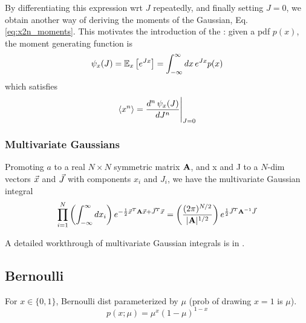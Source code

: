 \documentclass[11pt]{article}
\begin{document}
By differentiating this expression wrt $J$ repeatedly, and finally setting $J=0$, we
obtain another way of deriving the moments of the Gaussian,
Eq. \eqref{eq:x2n_moments}. This motivates the introduction of the : given a pdf $p(x)$, the moment generating function is
\begin{equation}
  \psi_x(J) = \mathbb{E}_x \left[ e^{J x} \right] = \int_{-\infty}^{\infty} dx\, e^{J x} p(x)
\end{equation}
which satisfies
\begin{equation}
  \langle x^n \rangle = \frac{d^n\, \psi_x(J)}{d J^n}\Bigg|_{J=0}
\end{equation}





\subsubsection{Multivariate Gaussians}
Promoting $a$ to a real $N \times N$ symmetric matrix $\mathbf{A}$, and x and J to a $N$-dim
vectors $\vec{x}$ and $\vec{J}$ with components $x_i$ and $J_i$, we have the multivariate
Gaussian integral 
\begin{equation}
  \prod_{i=1}^N \left( \int_{-\infty}^{\infty} dx_i \right)
  e^{-\frac{1}{2} \vec{x}^T \mathbf{A} \vec{x} + \vec{J}^T \vec{x}} =
  \left( \frac{(2 \pi)^{N/2}}{|\mathbf{A}|^{1/2}} \right) e^{\frac{1}{2} \vec{J}^T \mathbf{A}^{-1} \vec{J}}
\end{equation}
\TODOFIN{}

A detailed workthrough of multivariate Gaussian integrals is in
\href{http://vixra.org/abs/1404.0026}{}.

\subsection{Bernoulli}
For $x \in \{0, 1\}$, Bernoulli dist parameterized by $\mu$ (prob of drawing $x=1$ is
$\mu$).
\begin{equation}
  p(x; \mu) = \mu^x (1-\mu)^{1-x}
\end{equation}
\end{document}
